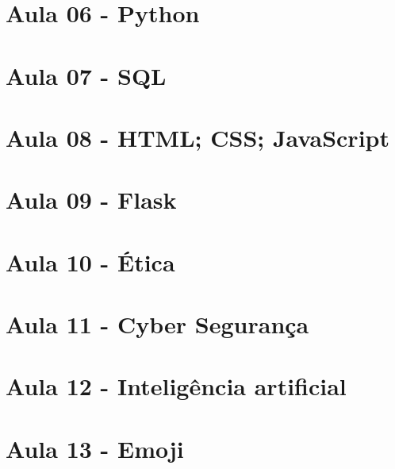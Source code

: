 \documentclass[12pt,a4paper]{article} %
\begin{document}
\section{Aula 06 - Python}

\section{Aula 07 - SQL}

\section{Aula 08 - HTML; CSS; JavaScript}

\section{Aula 09 - Flask}

\section{Aula 10 - Ética}

\section{Aula 11 - Cyber Segurança}

\section{Aula 12 - Inteligência artificial}

\section{Aula 13 - Emoji}
\end{document}

